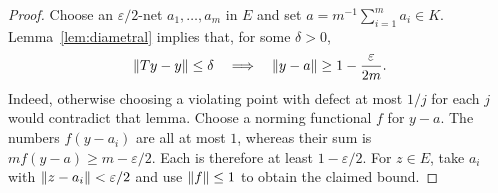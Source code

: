 \begin{proof}
Choose an $\varepsilon/2$-net $a_1,\ldots,a_m$ in $E$ and set
$a=m^{-1}\sum_{i=1}^m a_i\in K$. Lemma~\ref{lem:diametral} implies
that, for some $\delta>0$,
\[
 \lVert Ty-y\rVert\leq\delta
       \quad\Longrightarrow\quad
 \lVert y-a\rVert\geq1-\frac{\varepsilon}{2m}.
\]
Indeed, otherwise choosing a violating point with defect at most $1/j$
for each $j$ would contradict that lemma. Choose a norming functional
$f$ for $y-a$. The numbers $f(y-a_i)$ are all at most $1$, whereas
their sum is $m f(y-a)\geq m-\varepsilon/2$. Each is therefore at least
$1-\varepsilon/2$. For $z\in E$, take $a_i$ with
$\lVert z-a_i\rVert<\varepsilon/2$ and use $\lVert f\rVert\leq1$ to obtain the
claimed bound.
\end{proof}
